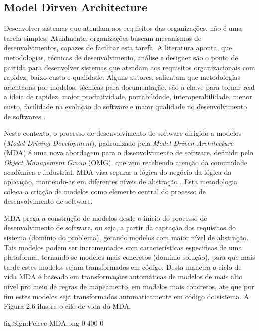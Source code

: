 \subsection{Model Dirven Architecture}


Desenvolver sistemas que atendam aos requisitos das organizações, não é uma tarefa simples. Atualmente, organizações buscam mecanismos de desenvolvimentos, capazes de facilitar esta tarefa. A literatura aponta, que metodologias, técnicas de desenvolvimento, análise e designer são o  ponto de partida para desenvolver sistemas que atendam aos requisitos organizacionais com rapidez, baixo custo e qualidade. Alguns autores, salientam que metodologias orientadas por modelos, técnicas para documentação, são a chave para tornar real a ideia de rapidez, maior produtividade, portabilidade, interoperabilidade, menor custo, facilidade na evolução do software e maior qualidade no desenvolvimento de softwares \cite{Placido}.

Neste contexto, o processo de desenvolvimento de software dirigido a modelos (\textit{Model Driving Development}), padronizado pela \textit{Model Driven Architecture} (MDA) é uma nova abordagem para o desenvolvimento de software, definida pelo \textit{Object Management Group} (OMG), que vem recebendo atenção da comunidade acadêmica e industrial. MDA visa separar a lógica do negócio da lógica da aplicação, mantendo-as em diferentes níveis de abstração \cite{miller2003}. Esta metodologia coloca a criação de modelos como elemento central do processo de desenvolvimento de software.

MDA prega a construção de modelos desde o início do processo de desenvolvimento de software, ou seja, a partir da captação dos requisitos do sistema (domínio do problema), gerando modelos com maior nível de abstração. Tais modelos podem ser incrementados com características especificas de uma plataforma, tornando-se modelos mais concretos (domínio solução), para que mais tarde estes modelos sejam transformados em código. Desta maneira o ciclo de vida MDA é baseado em transformações automáticas de modelos de mais alto nível pro meio de regras de mapeamento, em modelos mais concretos, ate que por fim estes modelos seja transformados automaticamente em código do sistema. A Figura 2.6 ilustra o cilo de vida do MDA.



       {fig:Sign:Peirce}
       {MDA.png}
       {0.400}
       {0}


